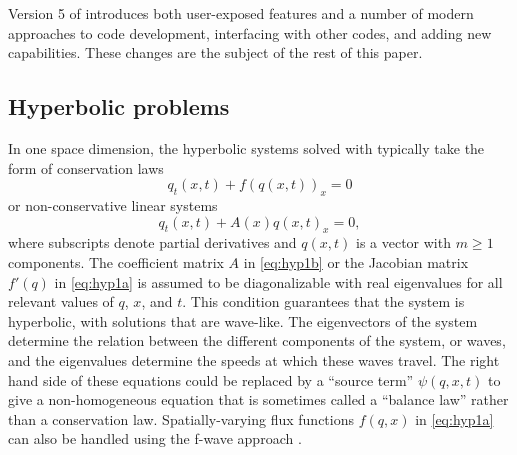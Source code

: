 Version 5 of \clawpack introduces both user-exposed features and a number of
modern approaches to code development, interfacing with other codes, and adding
new capabilities.    These changes are the subject of
the rest of this paper.

\subsection{Hyperbolic problems}\label{sec:hyp}

In one space dimension, the hyperbolic systems solved with
\clawpack typically take the form of conservation laws
\begin{equation}\label{eq:hyp1a}
q_t(x,t) + f(q(x,t))_x = 0
\end{equation}
or non-conservative linear systems
\begin{equation}\label{eq:hyp1b}
q_t(x,t) + A(x) q(x,t)_x = 0,
\end{equation}
where subscripts denote partial derivatives and $q(x,t)$ is a vector with
$m\ge 1$ components.
The coefficient matrix $A$ in \cref{eq:hyp1b} or
the Jacobian matrix $f'(q)$ in \cref{eq:hyp1a} is assumed to be
diagonalizable with real eigenvalues for all relevant values of
$q$, $x$, and $t$.  This condition guarantees that the system is hyperbolic,
with solutions that are wave-like.  The eigenvectors of the system
determine the relation between the different components
of the system, or waves, and the eigenvalues determine the speeds at which these
waves travel.  The right hand side of these equations could be
replaced by a ``source term'' $\psi(q,x,t)$ to give a non-homogeneous
equation that is sometimes called a ``balance law'' rather than a
conservation law.  Spatially-varying flux functions $f(q,x)$ in
\cref{eq:hyp1a} can also be handled using the f-wave approach
\cite{db-rjl-sm-jr:vcflux}.

